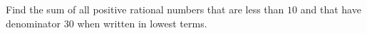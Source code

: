 Find the sum of all positive rational numbers that are less than $10$ and that have denominator $30$ when written in lowest terms.